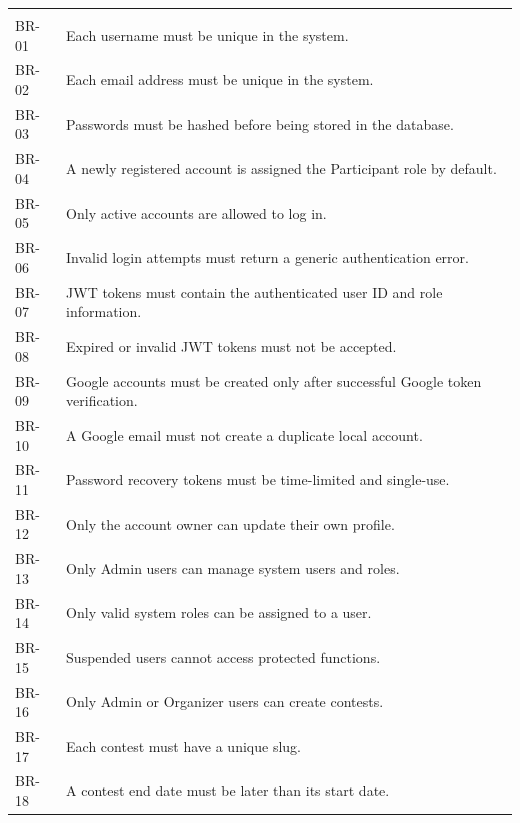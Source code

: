 \vspace{0.5em}
\renewcommand{\arraystretch}{1.15}
\setlength{\tabcolsep}{4pt}
\small
\begin{longtable}{|>{\centering\arraybackslash}p{}|>{\raggedright\arraybackslash}p{}|}
\hline
\multicolumn{1}{|c|}{\textbf{ID}} & \multicolumn{1}{c|}{\textbf{Rule Definition}} \\
\hline
\endfirsthead
\multicolumn{1}{|c|}{\textbf{ID}} & \multicolumn{1}{c|}{\textbf{Rule Definition}} \\
\hline
\endhead
BR-01 & Each username must be unique in the system. \\
\hline
BR-02 & Each email address must be unique in the system. \\
\hline
BR-03 & Passwords must be hashed before being stored in the database. \\
\hline
BR-04 & A newly registered account is assigned the Participant role by default. \\
\hline
BR-05 & Only active accounts are allowed to log in. \\
\hline
BR-06 & Invalid login attempts must return a generic authentication error. \\
\hline
BR-07 & JWT tokens must contain the authenticated user ID and role information. \\
\hline
BR-08 & Expired or invalid JWT tokens must not be accepted. \\
\hline
BR-09 & Google accounts must be created only after successful Google token verification. \\
\hline
BR-10 & A Google email must not create a duplicate local account. \\
\hline
BR-11 & Password recovery tokens must be time-limited and single-use. \\
\hline
BR-12 & Only the account owner can update their own profile. \\
\hline
BR-13 & Only Admin users can manage system users and roles. \\
\hline
BR-14 & Only valid system roles can be assigned to a user. \\
\hline
BR-15 & Suspended users cannot access protected functions. \\
\hline
BR-16 & Only Admin or Organizer users can create contests. \\
\hline
BR-17 & Each contest must have a unique slug. \\
\hline
BR-18 & A contest end date must be later than its start date. \\

\end{longtable}
